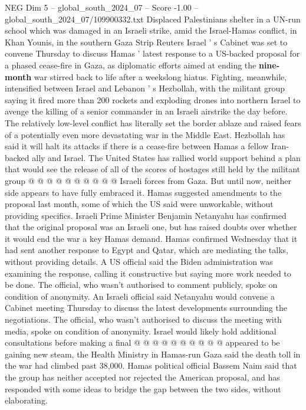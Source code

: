 \begin{textsample}{NEG Dim 5 – global\_south\_2024\_07 – Score -1.00 – global\_south\_2024\_07/109900332.txt}  \label{ex:f5_neg_271}
Displaced Palestinians shelter in a UN-run school which was damaged in an Israeli strike, amid the Israel-Hamas conflict, in Khan Younis, in the southern Gaza Strip Reuters Israel ' s Cabinet was set to convene Thursday to discuss Hamas ' latest response to a US-backed proposal for a phased cease-fire in Gaza, as diplomatic efforts aimed at ending the \textbf{nine-month} war stirred back to life after a weekslong hiatus.
Fighting, meanwhile, intensified between Israel and Lebanon ' s Hezbollah, with the militant group saying it fired more than 200 rockets and exploding drones into northern Israel to avenge the killing of a senior commander in an Israeli airstrike the day before.
The relatively low-level conflict has literally set the border ablaze and raised fears of a potentially even more devastating war in the Middle East.
Hezbollah has said it will halt its attacks if there is a cease-fire between Hamas a fellow Iran-backed ally and Israel.
The United States has rallied world support behind a plan that would see the release of all of the scores of hostages still held by the militant group @ @ @ @ @ @ @ @ @ @ Israeli forces from Gaza.
But until now, neither side appears to have fully embraced it.
Hamas suggested amendments to the proposal last month, some of which the US said were unworkable, without providing specifics.
Israeli Prime Minister Benjamin Netanyahu has confirmed that the original proposal was an Israeli one, but has raised doubts over whether it would end the war a key Hamas demand.
Hamas confirmed Wednesday that it had sent another response to Egypt and Qatar, which are mediating the talks, without providing details.
A US official said the Biden administration was examining the response, calling it constructive but saying more work needed to be done.
The official, who wasn't authorised to comment publicly, spoke on condition of anonymity.
An Israeli official said Netanyahu would convene a Cabinet meeting Thursday to discuss the latest developments surrounding the negotiations.
The official, who wasn't authorised to discuss the meeting with media, spoke on condition of anonymity.
Israel would likely hold additional consultations before making a final @ @ @ @ @ @ @ @ @ @ appeared to be gaining new steam, the Health Ministry in Hamas-run Gaza said the death toll in the war had climbed past 38,000.
Hamas political official Bassem Naim said that the group has neither accepted nor rejected the American proposal, and has responded with some ideas to bridge the gap between the two sides, without elaborating.

\end{textsample}
